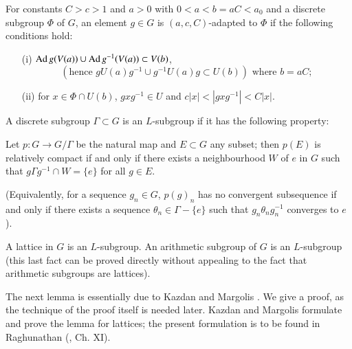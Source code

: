 \setcounter{definition}{1}
\begin{definition}\label{art9-def1.2}
For constants $C > c > 1$ and $a > 0$ with $0 < a < b = aC < a_0$ and a discrete subgroup $\Phi$ of $G$, an element $g \in G$ is $(a, c, C)$-adapted to $\Phi$ if the following conditions hold:
\begin{itemize}
\item[(i)] $\operatorname{Ad} g(V(a)) \cup \operatorname{Ad} g^{-1} (V(a)) \subset V (b)$,
$$
(\text{hence } g U (a) g^{-1} \cup g^{-1} U (a) g \subset U (b)) \text{ where } b = a C;
$$

\item[(ii)] for $x \in \Phi \cap U (b)$, $g x g^{-1} \in U$ and $c|x| < | gxg^{-1} |< C |x|$.
\end{itemize}
\end{definition}

\begin{definition}\label{art9-def1.3}
A discrete subgroup $\Gamma \subset G$ is an $L$-subgroup if it has the following property:

Let $p : G \to G / \Gamma$ be the natural map and $E \subset G$ any subset; then $p (E)$ is relatively compact if and only if there exists a neighbourhood $W$ of $e$ in $G$ such that $g \Gamma g^{-1} \cap W = \{e\}$ for all $g \in E$.

(Equivalently, for a sequence $g_n \in G$, $p (g)_n$ has no convergent subsequence if and only if there exists a sequence $\theta_n \in \Gamma-\{e\}$ such that $g_n \theta_n g^{-1}_n$ converges to $e$).
\end{definition}


\begin{subremark}\label{art9-subrem1.4}
A lattice in $G$ is an $L$-subgroup. An arithmetic subgroup of $G$ is an $L$-subgroup (this last fact can be proved directly without appealing to the fact that arithmetic subgroups are lattices).
\end{subremark}

The next lemma is essentially due to Kazdan and Margolis \cite{art9-kazdan-margolis-1}. We give a proof, as the technique of the proof itself is needed later. Kazdan and Margolis \cite{art9-kazdan-margolis-1} formulate and prove the lemma for lattices; the present formulation is to be found in Raghunathan (\cite{art9-raghunathan-1}, Ch. XI).

